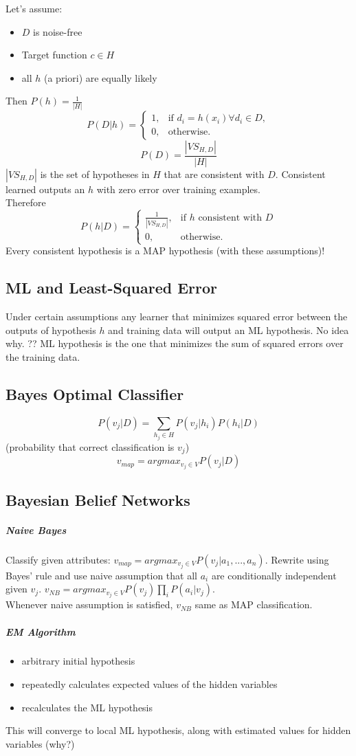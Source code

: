 \documentclass[titlepage,11pt]{article}
\begin{document}
Let's assume:
\begin{itemize}
\item $D$ is noise-free
\item Target function $c \in H$
\item all $h$ (a priori) are equally likely
\end{itemize}
Then $P(h) = \frac1{|H|}$\\
$$P(D|h) =
    \begin{cases}
            1, &         \text{if } d_i =h(x_i) \forall d_i \in D,\\
            0, &         \text{otherwise}.
    \end{cases}
$$
$$P(D) = \frac{|VS_{H,D}|}{|H|}$$ $|VS_{H,D}|$ is the set of hypotheses in $H$ that are consistent with $D$. Consistent learned outputs an $h$ with zero error over training examples.\\
Therefore $$P(h|D) = \begin{cases}
            \frac1{|VS_{H,D}|}, &         \text{if $h$ consistent with $D$}\\
            0, &         \text{otherwise}.
    \end{cases}
$$
Every consistent hypothesis is a MAP hypothesis (with these assumptions)!

\subsection{ML and Least-Squared Error}
Under certain assumptions any learner that minimizes squared error between the outputs of hypothesis $h$ and training data will output an ML hypothesis. No idea why. ?? ML hypothesis is the one that minimizes the sum of squared errors over the training data.

\subsection{Bayes Optimal Classifier}
$$P(v_j |D) = \sum_{h_j \in H}{P(v_j|h_i) P(h_i|D)}$$ (probability that correct classification is $v_j$)\\
$$v_{map} = argmax_{v_j \in V} P(v_j|D)$$

\subsection{Bayesian Belief Networks}
\subparagraph{Naive Bayes} Classify given attributes: $v_{map} = argmax_{v_j \in V} P(v_j|a_1,...,a_n)$. Rewrite using Bayes' rule and use naive assumption that all $a_i$ are conditionally independent given $v_j$. $v_{NB} = argmax_{v_j \in V} P(v_j) \prod_{i}{P(a_i|v_j)}$.\\
Whenever naive assumption is satisfied, $v_{NB}$ same as MAP classification.
\subparagraph{EM Algorithm}
\begin{itemize}
\item arbitrary initial hypothesis
\item repeatedly calculates expected values of the hidden variables
\item recalculates the ML hypothesis
\end{itemize}
This will converge to local ML hypothesis, along with estimated values for hidden variables (why?)
\end{document}
